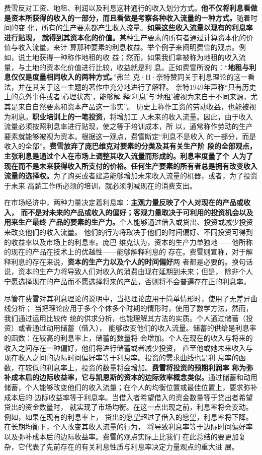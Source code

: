 费雪反对工资、地租、利润以及利息这种通行的收入划分方式。\textbf{他不仅将利息看做
  是资本所获得的收入的一部分，而且看做是考察各种收入流量的一种方式。}随着时间的变
化，所有的生产要素都产生收入流量。\textbf{如果这些收入流量以现有的利息率进行贴现，
  就得到其资本化的价值。}某种生产要素的所有者通过计算资本化的价值与收入流量，来计
算那种要素的利息收益。举个例子来阐明费雪的观点。例如，说土地获得一种称作地租的收
益；然而，如果我们拿被称为地租的收入流量，与土地的资本化价值进行比较，收益就是利
息。正如费雪所说的：“\textbf{地租与利息仅仅是度量相同收入的两种方式。}”弗兰
克·H·奈特赞同关于利息理论的这一看法，并在其关于这一主题的著作中充分地进行了解释。
奈特1949年声称“只有历史上的意外事件或者‘心理状态’，能够解
释‘利息’与‘地租’被视为来自于不同来源，尤其是来自自然要素和资本产品这一事实”。
历史上称作工资的劳动收益，也能被视为利息。\textbf{职业培训上的一笔投资}，将增加工
人未来的收入流量。因此，由于收入流量必须按照利息率进行贴现，使之等于培训成本，所
以，通常称作劳动的生产要素就能够被视为资本。根据这一观点，费雪断定“利息不是收入
的一部分，而是收入的全部”。\textbf{费雪放弃了庞巴维克对要素的分类及其有关生产阶
  段的全部观点，主张利息是通过个人在市场上调整其收入流量而形成的。利息率度量了个
  人为了现在而不是未来获得收入所支付的价格。任何生产要素的所有者总是拥有改变收入
  流量的选择权。}为了购买或者建造能够增加未来收入流量的机器，或者，为了投资于未来
高薪工作所必须的培训，就必须削减现在的消费支出。

在市场经济中，两种力量决定着利息率：\textbf{主观力量反映了个人对现在的产品或收入，
  而不是对未来的产品或收入的偏好；客观力量取决于可利用的投资机会以及用来生产最终
  产品的要素的生产力。}个人能够通过借入或贷出、投资或减少投资来改变他们的收入流量。
他们的行为将取决于他们的时间偏好、不同投资可得到的收益率以及市场上的利息率。庞巴
维克认为，资本的生产力单独地——他所称的现在的产品在技术上的优越性——能够解释利息的
存在。费雪则宣称，对于解释利息的存在来说，\textbf{资本的生产力以及个人的时间偏好}两
者都是必要的。换句话说，资本的生产力将导致人们对收入的消费由现在延期到未来；但是，
除非个人宁愿选择现在的产品而不愿选择将来的产品，否则将不会普遍存在正的利息率。

尽管在费雪对其利息理论的说明中，当把理论应用于简单情形时，使用了无差异曲线分析；
当把理论应用于多个个体多个时期的情形时，使用了数学方法，然而，我们通过运用比较传
统的供求分析，也能理解其方法的实质。个人通过储蓄（投资）或者通过动用储蓄（借入），
能够改变他们的收入流量。储蓄的供给是利息率的函数：在较高的利息率上，储蓄的数量将
会增加。个人在现在的收入与将来的收入之间存在一种偏好，他们将进行储蓄或者减少投资，
直至他或她未来收入与现在收入之间的边际时间偏好率等于利息率。投资的需求曲线也是利
息率的函数，在较低的利息率上，投资的数量将会增加。\textbf{费雪将投资的预期利润率
  称为弥补成本后的边际收益率，它与凯恩斯的资本的边际效率概念类似。}通过储蓄和动用
储蓄，个人能够改变他们的收入流量；在个人的均衡位置或最佳位置上，要求弥补成本后的
边际收益率等于利息率。当借入者希望借入的资金数量等于贷出者希望贷出的资金数量时，
就实现了市场均衡。在这一点出现之前，利息率将会变动。例如，如果在现有的利息率上，
贷出的愿望超过了借入的愿望，利息率将下降。在长期均衡下，个人改变其收入流量的行为，
将导致利息率等于边际时间偏好率以及弥补成本后的边际收益率。费雪的观点实际上比我们
在此总结的要更加复杂，它代表了先前存在的有关利息性质与利息率决定力量观点的重大进
展。


